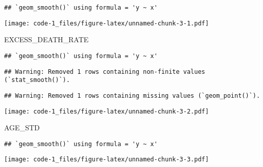 \documentclass[
]{article}
\newenvironment{Shaded}{\begin{snugshade}}{\end{snugshade}}
\newcommand{\NormalTok}[1]{#1}
\begin{document}
\begin{verbatim}
## `geom_smooth()` using formula = 'y ~ x'
\end{verbatim}

\texttt{[image: code-1\_files/figure-latex/unnamed-chunk-3-1.pdf]}

\begin{Shaded}
\begin{Highlighting}[]
\NormalTok{EXCESS\_DEATH\_RATE}
\end{Highlighting}
\end{Shaded}

\begin{verbatim}
## `geom_smooth()` using formula = 'y ~ x'
\end{verbatim}

\begin{verbatim}
## Warning: Removed 1 rows containing non-finite values (`stat_smooth()`).
\end{verbatim}

\begin{verbatim}
## Warning: Removed 1 rows containing missing values (`geom_point()`).
\end{verbatim}

\texttt{[image: code-1\_files/figure-latex/unnamed-chunk-3-2.pdf]}

\begin{Shaded}
\begin{Highlighting}[]
\NormalTok{AGE\_STD}
\end{Highlighting}
\end{Shaded}

\begin{verbatim}
## `geom_smooth()` using formula = 'y ~ x'
\end{verbatim}

\texttt{[image: code-1\_files/figure-latex/unnamed-chunk-3-3.pdf]}
\end{document}

